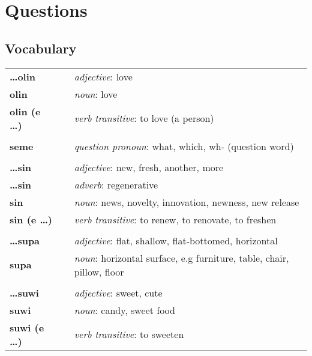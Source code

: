 \section{Questions}
\subsection*{Vocabulary}
%
\begin{supertabular}{p{2,5cm}|ll}
%
\textbf{\dots olin} && \textit{adjective}: love \\ %
\textbf{olin} && \textit{noun}: love \\ %
\textbf{olin (e \dots)} && \textit{verb transitive}: to love (a person) \\ %
 && \\ %
%
\textbf{seme} && \textit{question pronoun}: what, which, wh- (question word) \\ %
 && \\ %
%
\textbf{\dots sin} && \textit{adjective}: new, fresh, another, more \\ %
\textbf{ \dots sin } && \textit{adverb}: regenerative \\ %
\textbf{sin} && \textit{noun}: news, novelty, innovation, newness, new release \\ %
\textbf{sin (e \dots)} && \textit{verb transitive}: to renew, to renovate, to freshen \\ %
 && \\ %
%
\textbf{\dots supa} && \textit{adjective}: flat, shallow, flat-bottomed, horizontal \\ %
\textbf{supa} && \textit{noun}: horizontal surface, e.g furniture, table, chair, pillow, floor \\ %
 && \\ %
%
\textbf{\dots suwi} && \textit{adjective}: sweet, cute \\ %
\textbf{suwi} && \textit{noun}: candy, sweet food \\ %
\textbf{suwi (e \dots)} && \textit{verb transitive}: to sweeten \\ %
\end{supertabular} \\
%
\newpage
%
